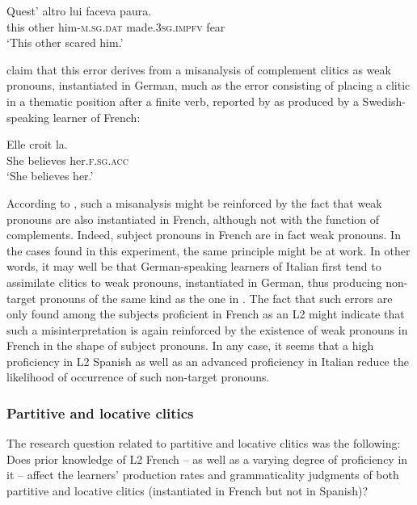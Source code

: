 \documentclass[output=paper,modfonts,nonflat,newtxmath]{langsci/langscibook}
\begin{document}
\ea \label{ex:sciutti:38}
    \gll Quest’ altro lui faceva paura. \\
         this  other   him-\textsc{m.sg.dat}  made.\textsc{3sg.impfv}   fear   \\
    \glt  ‘This other scared him.’
\z

\z


\citet{HamannBelletti2006} claim that this error derives from a misanalysis of complement clitics as weak pronouns, instantiated in German, much as the error consisting of placing a clitic in a thematic position after a finite verb, reported by \citet[355]{GranfeldtSchlyter2004} as produced by a Swedish-speaking learner of French:

\ea \label{ex:sciutti:40}
    \gll Elle croit la.\\
    She believes her.\textsc{f.sg.acc}\\
    \glt  ‘She believes her.’
\z{}

According to \citet{HamannBelletti2006}, such a misanalysis might be reinforced by the fact that weak pronouns are also instantiated in French, although not with the function of complements. Indeed, subject pronouns in French are in fact weak pronouns. In the cases found in this experiment, the same principle might be at work. In other words, it may well be that German-speaking learners of Italian first tend to assimilate clitics to weak pronouns, instantiated in German, thus producing non-target pronouns of the same kind as the one in . The fact that such errors are only found among the subjects proficient in French as an L2 might indicate that such a misinterpretation is again reinforced by the existence of weak pronouns in French in the shape of subject pronouns. In any case, it seems that a high proficiency in L2 Spanish as well as an advanced proficiency in Italian reduce the likelihood of occurrence of such non-target pronouns.

\subsubsection{Partitive {and} {locative} clitics} %

The research question related to partitive and locative clitics was the following: Does prior knowledge of L2 French – as well as a varying degree of proficiency in it – affect the learners’ production rates and grammaticality judgments of both partitive and locative clitics (instantiated in French but not in Spanish)?
\end{document}

